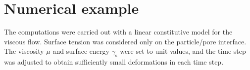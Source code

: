 \documentclass[12pt,a4paper,fleqn]{article}
\newcommand{\surf}{\mathrm{s}}
\begin{document}
\section{Numerical example}\label{sec:examples}

The computations were carried out with a linear constitutive model for the viscous flow. Surface tension was considered only on the particle/pore interface. The viscosity $\mu$ and surface energy $\gamma_\surf$ were set to unit values, and the time step was adjusted to obtain sufficiently small deformations in each time step.
%
\begin{figure}[thpb!]
    \centering
    \hspace{1em}

\end{figure}
\end{document}
